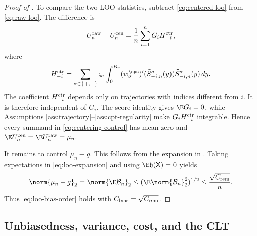 \begin{proof}[Proof of ]
To compare the two LOO statistics, subtract \eqref{eq:centered-loo} from \eqref{eq:raw-loo}.  The difference is
\begin{equation}\label{eq:centering-control}
 U_n^{\rm raw}-U_n^{\rm cen}
 =\frac1n\sum_{i=1}^{n}G_i H_{-i}^{\rm ctr},
\end{equation}
where
\[
 H_{-i}^{\rm ctr}
 =\sum_{\sigma\in\{+,-\}}\varsigma_\sigma
 \int_0^{B_v}
 (w_\sigma^\eps)'(\widehat S_{-i,n}^\sigma(y))
 \widehat S_{-i,n}^\sigma(y)\,dy.
\]
The coefficient $H_{-i}^{\rm ctr}$ depends only on trajectories with indices different from $i$.  It is therefore independent of $G_i$.  The score identity gives $\E G_i=0$, while Assumptions \ref{ass:trajectory}--\ref{ass:cpt-regularity} make $G_iH_{-i}^{\rm ctr}$ integrable.  Hence every summand in \eqref{eq:centering-control} has mean zero and
$\E U_n^{\rm cen}=\E U_n^{\rm raw}=\mu_n$.

It remains to control $\mu_n-g$.  This follows from the expansion in .  Taking expectations in \eqref{eq:loo-expansion} and using $\E\mathfrak h(\mathsf X)=0$ yields
\[
 \norm{\mu_n-g}_2
 =\norm{\E \mathcal B_n}_2
 \le(\E\norm{\mathcal B_n}_2^2)^{1/2}
 \le\frac{\sqrt{C_{\rm rem}}}{n}.
\]
Thus \eqref{eq:loo-bias-order} holds with $C_{\rm bias}=\sqrt{C_{\rm rem}}$.
\end{proof}


\subsection{Unbiasedness, variance, cost, and the CLT}


